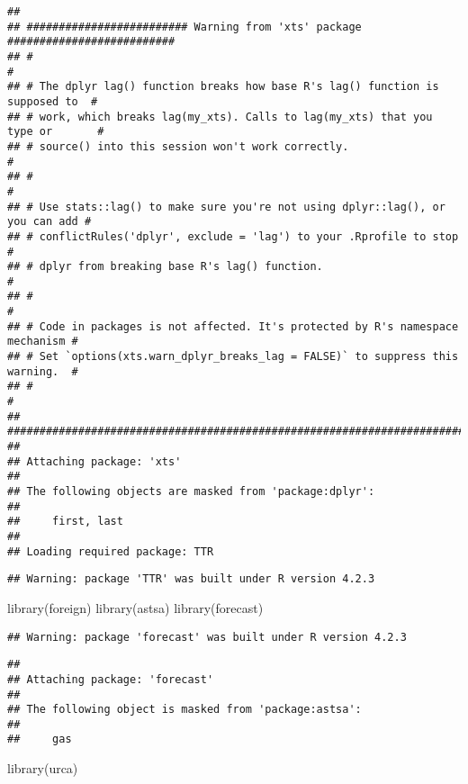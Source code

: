 \documentclass[
]{article}
\newenvironment{Shaded}{\begin{snugshade}}{\end{snugshade}}
\newcommand{\FunctionTok}[1]{\textcolor[rgb]{0.00,0.00,0.00}{#1}}
\newcommand{\NormalTok}[1]{#1}
\begin{document}
\begin{verbatim}
## 
## ######################### Warning from 'xts' package ##########################
## #                                                                             #
## # The dplyr lag() function breaks how base R's lag() function is supposed to  #
## # work, which breaks lag(my_xts). Calls to lag(my_xts) that you type or       #
## # source() into this session won't work correctly.                            #
## #                                                                             #
## # Use stats::lag() to make sure you're not using dplyr::lag(), or you can add #
## # conflictRules('dplyr', exclude = 'lag') to your .Rprofile to stop           #
## # dplyr from breaking base R's lag() function.                                #
## #                                                                             #
## # Code in packages is not affected. It's protected by R's namespace mechanism #
## # Set `options(xts.warn_dplyr_breaks_lag = FALSE)` to suppress this warning.  #
## #                                                                             #
## ###############################################################################
## 
## Attaching package: 'xts'
## 
## The following objects are masked from 'package:dplyr':
## 
##     first, last
## 
## Loading required package: TTR
\end{verbatim}

\begin{verbatim}
## Warning: package 'TTR' was built under R version 4.2.3
\end{verbatim}

\begin{Shaded}
\begin{Highlighting}[]
\FunctionTok{library}\NormalTok{(foreign)}
\FunctionTok{library}\NormalTok{(astsa)}
\FunctionTok{library}\NormalTok{(forecast)}
\end{Highlighting}
\end{Shaded}

\begin{verbatim}
## Warning: package 'forecast' was built under R version 4.2.3
\end{verbatim}

\begin{verbatim}
## 
## Attaching package: 'forecast'
## 
## The following object is masked from 'package:astsa':
## 
##     gas
\end{verbatim}

\begin{Shaded}
\begin{Highlighting}[]
\FunctionTok{library}\NormalTok{(urca)}
\end{Highlighting}
\end{Shaded}
\end{document}
